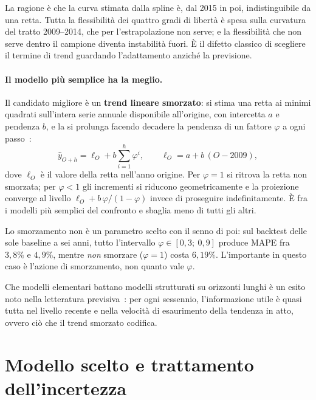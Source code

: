La ragione è che la
curva stimata dalla spline è, dal 2015 in poi, indistinguibile da una retta.
Tutta la flessibilità dei quattro gradi di libertà è spesa sulla curvatura del
tratto 2009--2014, che per l'estrapolazione non serve; e la flessibilità che
non serve dentro il campione diventa instabilità fuori. È il difetto classico
di scegliere il termine di trend guardando l'adattamento anziché la previsione.

\paragraph{Il modello più semplice ha la meglio.}
Il candidato migliore è un \textbf{trend lineare smorzato}: si stima una retta
ai minimi quadrati sull'intera serie annuale disponibile all'origine, con
intercetta $a$ e pendenza $b$, e la si prolunga facendo decadere la pendenza
di un fattore $\varphi$ a ogni passo~\cite{GardnerMcKenzie1985}:
\begin{equation}
  \hat{y}_{O+h} = \ell_O + b \sum_{i=1}^{h} \varphi^{i},
  \qquad \ell_O = a + b\,(O - 2009),
  \label{eq:damped}
\end{equation}
dove $\ell_O$ è il valore della retta nell'anno origine. Per $\varphi = 1$ si
ritrova la retta non smorzata; per $\varphi < 1$ gli incrementi si
riducono geometricamente e la proiezione converge al livello
$\ell_O + b\,\varphi/(1-\varphi)$ invece di proseguire indefinitamente. È fra i
modelli più semplici del confronto e sbaglia meno di tutti gli altri.

Lo smorzamento non è un parametro scelto con il senno di poi: sul backtest delle
sole baseline a sei anni, tutto l'intervallo $\varphi \in [0{,}3;\ 0{,}9]$ produce MAPE fra $3{,}8\%$ e
$4{,}9\%$, mentre \emph{non} smorzare ($\varphi = 1$) costa $6{,}19\%$. L'importante
in questo caso è l'azione di smorzamento, non quanto vale $\varphi$.

Che modelli elementari battano modelli strutturati su orizzonti lunghi è un
esito noto nella letteratura previsiva~\cite{GardnerMcKenzie1985,Tashman2000}: 
per ogni sessennio, l'informazione utile è quasi tutta nel livello recente e
nella velocità di esaurimento della tendenza in atto, ovvero ciò che il trend smorzato
codifica.

\section{Modello scelto e trattamento dell'incertezza}
\label{sec:fc_choice}

